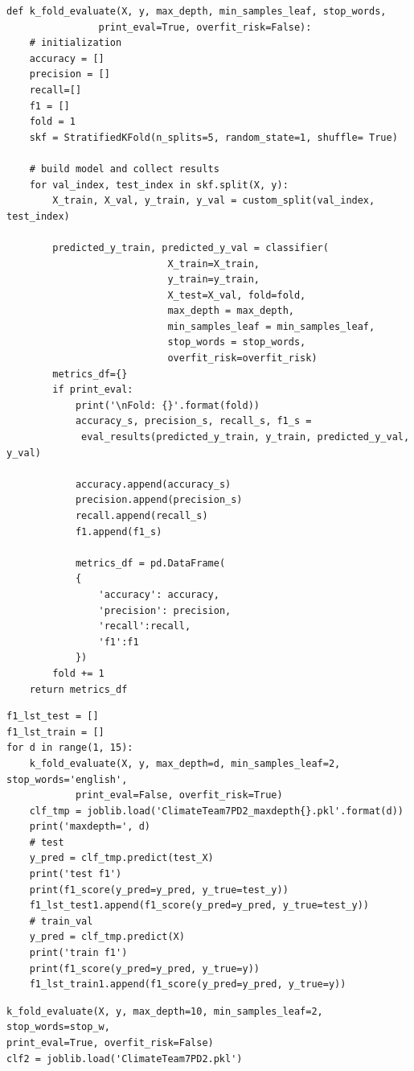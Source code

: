 \documentclass{article} %
\begin{document}
\lstset{language=Python}
\lstset{frame=lines}
\lstset{basicstyle=\footnotesize}
\begin{lstlisting}
def k_fold_evaluate(X, y, max_depth, min_samples_leaf, stop_words,
				print_eval=True, overfit_risk=False):
	# initialization
	accuracy = []
	precision = []
	recall=[]
	f1 = []
	fold = 1
	skf = StratifiedKFold(n_splits=5, random_state=1, shuffle= True)

	# build model and collect results
	for val_index, test_index in skf.split(X, y):
		X_train, X_val, y_train, y_val = custom_split(val_index, test_index)

		predicted_y_train, predicted_y_val = classifier(
							X_train=X_train,
							y_train=y_train, 
							X_test=X_val, fold=fold,
							max_depth = max_depth,
							min_samples_leaf = min_samples_leaf,
							stop_words = stop_words,
							overfit_risk=overfit_risk)
		metrics_df={}
		if print_eval:
			print('\nFold: {}'.format(fold))
			accuracy_s, precision_s, recall_s, f1_s =
			 eval_results(predicted_y_train, y_train, predicted_y_val, y_val)
			
			accuracy.append(accuracy_s)
			precision.append(precision_s)
			recall.append(recall_s)
			f1.append(f1_s)
			
			metrics_df = pd.DataFrame(
			{
				'accuracy': accuracy,
				'precision': precision,
				'recall':recall,
				'f1':f1
			})
		fold += 1
	return metrics_df
\end{lstlisting}


\lstset{language=Python}
\lstset{frame=lines}
\lstset{basicstyle=\footnotesize}
\begin{lstlisting}
f1_lst_test = []
f1_lst_train = []
for d in range(1, 15):
	k_fold_evaluate(X, y, max_depth=d, min_samples_leaf=2, stop_words='english', 
			print_eval=False, overfit_risk=True)
	clf_tmp = joblib.load('ClimateTeam7PD2_maxdepth{}.pkl'.format(d))
	print('maxdepth=', d)
	# test
	y_pred = clf_tmp.predict(test_X)
	print('test f1')
	print(f1_score(y_pred=y_pred, y_true=test_y))
	f1_lst_test1.append(f1_score(y_pred=y_pred, y_true=test_y))
	# train_val
	y_pred = clf_tmp.predict(X)
	print('train f1')
	print(f1_score(y_pred=y_pred, y_true=y))
	f1_lst_train1.append(f1_score(y_pred=y_pred, y_true=y))
\end{lstlisting}

\lstset{language=Python}
\lstset{frame=lines}
\lstset{basicstyle=\footnotesize}
\begin{lstlisting}
k_fold_evaluate(X, y, max_depth=10, min_samples_leaf=2, 
stop_words=stop_w, 
print_eval=True, overfit_risk=False)
clf2 = joblib.load('ClimateTeam7PD2.pkl')
\end{lstlisting}
\end{document}
